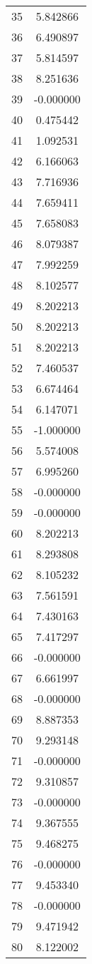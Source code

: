 \documentclass[12pt]{article}
\begin{document}
\begin{longtable}{@{}cc@{}}
35 & 5.842866 \\
36 & 6.490897 \\
37 & 5.814597 \\
38 & 8.251636 \\
39 & -0.000000 \\
40 & 0.475442 \\
41 & 1.092531 \\
42 & 6.166063 \\
43 & 7.716936 \\
44 & 7.659411 \\
45 & 7.658083 \\
46 & 8.079387 \\
47 & 7.992259 \\
48 & 8.102577 \\
49 & 8.202213 \\
50 & 8.202213 \\
51 & 8.202213 \\
52 & 7.460537 \\
53 & 6.674464 \\
54 & 6.147071 \\
55 & -1.000000 \\
56 & 5.574008 \\
57 & 6.995260 \\
58 & -0.000000 \\
59 & -0.000000 \\
60 & 8.202213 \\
61 & 8.293808 \\
62 & 8.105232 \\
63 & 7.561591 \\
64 & 7.430163 \\
65 & 7.417297 \\
66 & -0.000000 \\
67 & 6.661997 \\
68 & -0.000000 \\
69 & 8.887353 \\
70 & 9.293148 \\
71 & -0.000000 \\
72 & 9.310857 \\
73 & -0.000000 \\
74 & 9.367555 \\
75 & 9.468275 \\
76 & -0.000000 \\
77 & 9.453340 \\
78 & -0.000000 \\
79 & 9.471942 \\
80 & 8.122002 \\

\end{longtable}
\end{document}

